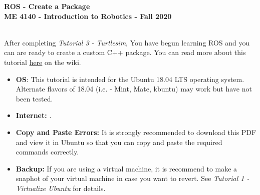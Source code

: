 \documentclass[12pt]{article}
\newcommand{\R}{\color{red}}
\begin{document}
\thispagestyle{plain}

\begin{center}
   {\bf \Large ROS - Create a Package}\vspace{2mm} \\
   {\bf \large ME 4140 - Introduction to Robotics - Fall 2020} \vspace{5mm}\\
\end{center}

\begin{description}[labelindent=1cm]
	
	\item[\textbf{\underline{Overview:}}] \hfill \vspace{3mm}\\
	After completing {\it Tutorial 3 - Turtlesim}, You have begun learning ROS and you can are ready to create a custom C++ package. You can read more about this tutorial \href{http://wiki.ros.org/catkin/Tutorials/create_a_workspace}{here} on the wiki.
	
	\item[\textbf{\underline{System Requirements:}}] \hfill \vspace{0mm}
	
	\begin{itemize}
		\item {\bf OS}: This tutorial is intended for the Ubuntu 18.04 LTS operating system. Alternate flavors of 18.04 (i.e. - Mint, Mate, kbuntu) may work but have not been tested.
		\item {\bf Internet:} .

	\end{itemize}
	
	\item[\textbf{\underline{Disclaimer:}}] \hfill \vspace{0mm}
	
	\begin{itemize}
		\item {\bf\R Copy and Paste Errors:} {\R It is strongly recommended to download this PDF and view it in Ubuntu so that you can copy and paste the required commands correctly.}
	
		\item {\bf Backup: } If you are using a virtual machine, it is recommend to make a snaphot of your virtual machine in case you want to revert. See {\it Tutorial 1 - Virtualize Ubuntu } for details.   
	\end{itemize}


\end{description}
\end{document}

